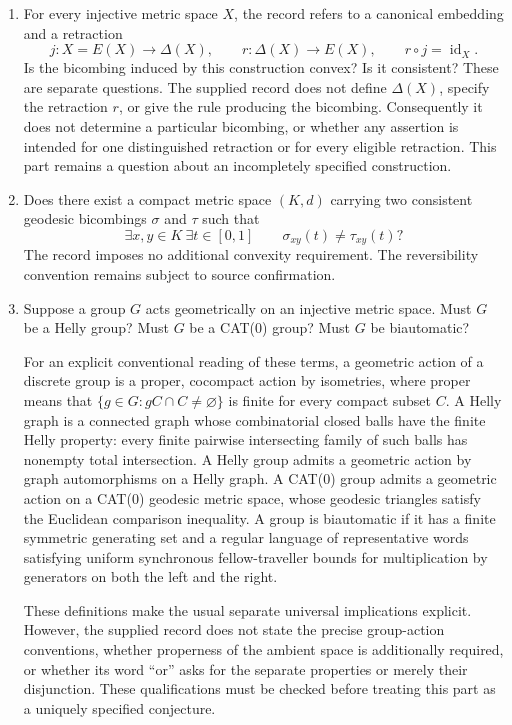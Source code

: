 \documentclass[11pt]{article}
\begin{document}
\begin{enumerate}
\item For every injective metric space \(X\), the record refers to a canonical embedding and a retraction
\[
j:X=E(X)\longrightarrow\Delta(X),\qquad r:\Delta(X)\longrightarrow E(X),\qquad r\circ j=\operatorname{id}_X.
\]
Is the bicombing induced by this construction convex? Is it consistent? These are separate questions. The supplied record does not define \(\Delta(X)\), specify the retraction \(r\), or give the rule producing the bicombing. Consequently it does not determine a particular bicombing, or whether any assertion is intended for one distinguished retraction or for every eligible retraction. This part remains a question about an incompletely specified construction.

\item Does there exist a compact metric space \((K,d)\) carrying two consistent geodesic bicombings \(\sigma\) and \(\tau\) such that
\[
\exists x,y\in K\ \exists t\in[0,1]\qquad \sigma_{xy}(t)\ne\tau_{xy}(t)?
\]
The record imposes no additional convexity requirement. The reversibility convention remains subject to source confirmation.

\item Suppose a group \(G\) acts geometrically on an injective metric space. Must \(G\) be a Helly group? Must \(G\) be a CAT(0) group? Must \(G\) be biautomatic?

For an explicit conventional reading of these terms, a geometric action of a discrete group is a proper, cocompact action by isometries, where proper means that \(\{g\in G:gC\cap C\ne\varnothing\}\) is finite for every compact subset \(C\). A Helly graph is a connected graph whose combinatorial closed balls have the finite Helly property: every finite pairwise intersecting family of such balls has nonempty total intersection. A Helly group admits a geometric action by graph automorphisms on a Helly graph. A CAT(0) group admits a geometric action on a CAT(0) geodesic metric space, whose geodesic triangles satisfy the Euclidean comparison inequality. A group is biautomatic if it has a finite symmetric generating set and a regular language of representative words satisfying uniform synchronous fellow-traveller bounds for multiplication by generators on both the left and the right.

These definitions make the usual separate universal implications explicit. However, the supplied record does not state the precise group-action conventions, whether properness of the ambient space is additionally required, or whether its word ``or'' asks for the separate properties or merely their disjunction. These qualifications must be checked before treating this part as a uniquely specified conjecture.
\end{enumerate}
\end{document}
